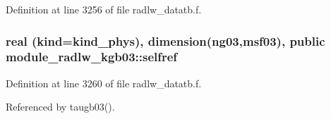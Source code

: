 Definition at line 3256 of file radlw\+\_\+datatb.\+f.

\subsubsection[{\texorpdfstring{selfref}{selfref}}]{\setlength{\rightskip}{0pt plus 5cm}real (kind=kind\+\_\+phys), dimension(ng03,{\bf msf03}), public module\+\_\+radlw\+\_\+kgb03\+::selfref}\hypertarget{namespacemodule__radlw__kgb03_a6bb40d898660e6dfc056d3efe1d0c544}{}\label{namespacemodule__radlw__kgb03_a6bb40d898660e6dfc056d3efe1d0c544}


Definition at line 3260 of file radlw\+\_\+datatb.\+f.



Referenced by taugb03().

